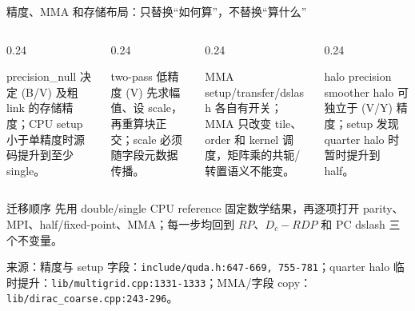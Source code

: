 \documentclass[UTF8,aspectratio=169,11pt]{ctexbeamer}
\newcommand{\source}[1]{\vspace{0.05em}\par{\raggedright\scriptsize\color{muted}来源：#1\par}}
\newcommand{\codepath}[1]{\nolinkurl{#1}}
\begin{document}
\begin{frame}[t]{精度、MMA 和存储布局：只替换“如何算”，不替换“算什么”}
  \begin{columns}[T,totalwidth=\textwidth]
    \begin{column}{0.24\textwidth}
      \begin{block}{precision\_null}
        决定 (B/V) 及粗 link 的存储精度；CPU setup 小于单精度时源码提升到至少 single。
      \end{block}
    \end{column}
    \begin{column}{0.24\textwidth}
      \begin{block}{two-pass}
        低精度 (V) 先求幅值、设 scale，再重算块正交；scale 必须随字段元数据传播。
      \end{block}
    \end{column}
    \begin{column}{0.24\textwidth}
      \begin{block}{MMA}
        setup/transfer/dslash 各自有开关；MMA 只改变 tile、order 和 kernel 调度，矩阵乘的共轭/转置语义不能变。
      \end{block}
    \end{column}
    \begin{column}{0.24\textwidth}
      \begin{block}{halo precision}
        smoother halo 可独立于 (V/Y) 精度；setup 发现 quarter halo 时暂时提升到 half。
      \end{block}
    \end{column}
  \end{columns}
  \vspace{0.22cm}
  \begin{center}
  \end{center}
  \begin{alertblock}{迁移顺序}
    先用 double/single CPU reference 固定数学结果，再逐项打开 parity、MPI、half/fixed-point、MMA；每一步均回到 \(RP\)、\(D_c-RDP\) 和 PC dslash 三个不变量。
  \end{alertblock}
    \source{精度与 setup 字段：\codepath{include/quda.h:647-669, 755-781}；quarter halo 临时提升：\codepath{lib/multigrid.cpp:1331-1333}；MMA/字段 copy：\codepath{lib/dirac_coarse.cpp:243-296}。}
\end{frame}
\end{document}
